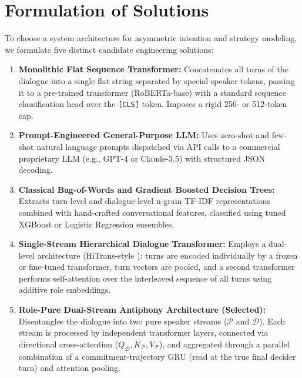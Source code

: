 \section{Formulation of Solutions}
\label{sec:alternatives}

To choose a system architecture for asymmetric intention and strategy modeling, we formulate five distinct candidate engineering solutions:

\begin{enumerate}[wide=0pt, label=\textbf{Candidate \arabic*:}, itemsep=6pt]
  \item \textbf{Monolithic Flat Sequence Transformer:} Concatenates all turns of the dialogue into a single flat string separated by special speaker tokens, passing it to a pre-trained transformer (RoBERTa-base) with a standard sequence classification head over the \texttt{[CLS]} token. Imposes a rigid 256- or 512-token cap.
  \item \textbf{Prompt-Engineered General-Purpose LLM:} Uses zero-shot and few-shot natural language prompts dispatched via API calls to a commercial proprietary LLM (e.g., GPT-4 or Claude-3.5) with structured JSON decoding.
  \item \textbf{Classical Bag-of-Words and Gradient Boosted Decision Trees:} Extracts turn-level and dialogue-level n-gram TF-IDF representations combined with hand-crafted conversational features, classified using tuned XGBoost \cite{chen2016xgboost} or Logistic Regression ensembles.
  \item \textbf{Single-Stream Hierarchical Dialogue Transformer:} Employs a dual-level architecture (HiTrans-style \cite{li2020hitrans}): turns are encoded individually by a frozen or fine-tuned transformer, turn vectors are pooled, and a second transformer performs self-attention over the interleaved sequence of all turns using additive role embeddings.
  \item \textbf{Role-Pure Dual-Stream Antiphony Architecture (Selected):} Disentangles the dialogue into two pure speaker streams ($\mathcal{P}$ and $\mathcal{D}$). Each stream is processed by independent transformer layers, connected via directional cross-attention ($Q_{\mathcal{D}}, K_{\mathcal{P}}, V_{\mathcal{P}}$), and aggregated through a parallel combination of a commitment-trajectory GRU (read at the true final decider turn) and attention pooling.
\end{enumerate}

